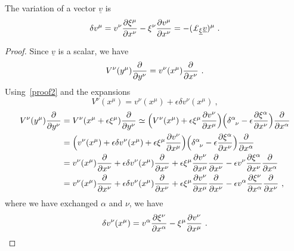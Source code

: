    The variation of a vector $\underline v$ is 
    \begin{equation*}
        \delta v^\mu = v^\nu \pdv{\xi^\mu}{x^\nu} - \xi^\nu \pdv{v^\mu}{x^\nu} = - (\pounds_{\underline \xi} \underline v)^\mu ~.
    \end{equation*}
    \begin{proof}
        Since $\underline v$ is a scalar, we have 
        \begin{equation*}
            V^\nu (y^\mu) \frac{\partial}{\partial y^\nu} = v^\nu (x^\mu) \frac{\partial}{\partial x^\nu} ~.
        \end{equation*}
        Using~\eqref{proof2} and the expansions 
        \begin{equation*}
            V^\nu(x^\mu) = v^\nu(x^\mu) + \epsilon \delta v^\nu(x^\mu) ~,
        \end{equation*}
        \begin{equation*}
        \begin{aligned}
            V^\nu (y^\mu) \pdv{}{y^\nu} & = V^\nu (x^\mu + \epsilon \xi^\mu) \pdv{}{y^\nu} \simeq \Big( V^\nu (x^\mu) + \epsilon \xi^\mu \pdv{v^\nu}{x^\mu} \Big) \Big (\delta^\alpha_{\phantom \alpha \nu} - \epsilon \pdv{\xi^\alpha}{x^\nu} \Big ) \pdv{}{x^\alpha} \\ & = \Big( v^\nu (x^\mu) + \epsilon \delta v^\nu(x^\mu) + \epsilon \xi^\mu \pdv{v^\nu}{x^\mu} \Big) \Big (\delta^\alpha_{\phantom \alpha \nu} - \epsilon \pdv{\xi^\alpha}{x^\nu} \Big ) \pdv{}{x^\alpha} \\ & = v^\nu (x^\mu) \pdv{}{x^\nu} + \epsilon \delta v^\nu (x^\mu) \pdv{}{x^\nu} + \epsilon \xi^\mu \pdv{v^\nu}{x^\mu} \pdv{}{x^\nu} - \epsilon v^\nu \pdv{\xi^\alpha}{x^\nu} \pdv{}{x^\alpha} \\ & = v^\nu (x^\mu) \pdv{}{x^\nu} + \epsilon \delta v^\nu (x^\mu) \pdv{}{x^\nu} + \epsilon \xi^\mu \pdv{v^\nu}{x^\mu} \pdv{}{x^\nu} - \epsilon v^\alpha \pdv{\xi^\nu}{x^\alpha} \pdv{}{x^\nu} ~,
        \end{aligned}
        \end{equation*} 
        where we have exchanged $\alpha$ and $\nu$, we have 
        \begin{equation*}
            \delta v^\nu (x^\mu) = v^\alpha \frac{\partial\xi^\nu}{\partial x^\alpha} - \xi^\mu \frac{\partial v^\nu}{\partial x^\mu} ~.
        \end{equation*}
    \end{proof}

